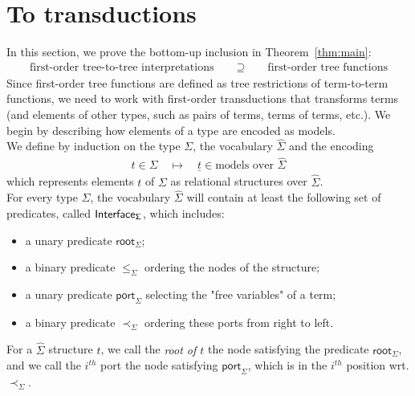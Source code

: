 \newcommand{\Root}[1]{\mathsf{root}_{#1}}
\newcommand{\Port}[1]{\mathsf{port}_{#1}}
\newcommand{\Interface}[1]{\mathsf{Interface}_{#1}}
\section{To transductions}
\label{sec:to-transductions}
In this section, we prove the bottom-up inclusion in Theorem~\ref{thm:main}:
\begin{align*}
    \text{first-order tree-to-tree interpretations} \qquad \supseteq \qquad \text{first-order tree functions}
\end{align*}
Since first-order tree functions are defined as tree restrictions of term-to-term functions, we need to work with first-order transductions that transforms terms (and elements of other types, such as pairs of terms, terms of terms, etc.). We begin by describing how elements of a type are encoded as models. 
\\

We define by induction on the type $\Sigma$, the vocabulary $\widehat \Sigma$ and the encoding 
 \begin{align*}
     t \in \Sigma \quad \mapsto \quad \underline t \in \text{models over $\widehat \Sigma$}
 \end{align*}
 which represents elements $t$ of $\Sigma$ as relational structures over $\widehat \Sigma$.
 \\
 
 For every type $\Sigma$, the vocabulary $\widehat \Sigma$ will contain at least the following set of predicates, called $\sf{Interface}_\Sigma$, which includes:
 \begin{itemize}
 \item a unary predicate $\Root{\Sigma}$;
 \item a binary predicate $\leq_\Sigma$ ordering the nodes of the structure;
  \item a unary predicate $\Port{\Sigma}$ selecting the "free variables" of a term; 
 \item a binary predicate $\prec_\Sigma$ ordering these ports from right to left.  
\end{itemize}  

For a $\widehat\Sigma$ structure $t$, we call the \emph{root of $t$} the node satisfying the predicate $\Root{\Sigma}$, and we call {the $i^{th}$ port} the node satisfying $\Port\Sigma$, which is in the $i^{th}$ position wrt. $\prec_\Sigma$. 
\\

